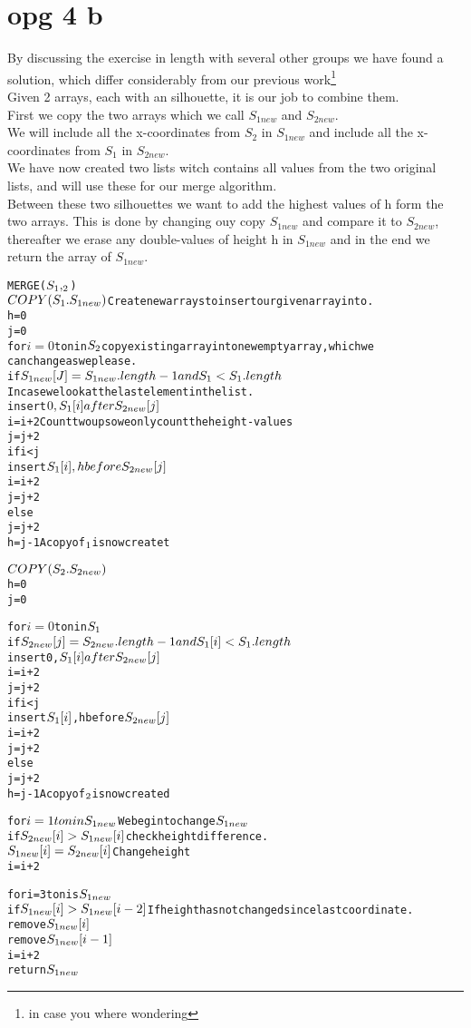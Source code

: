 \documentclass{article}
\begin{document}
\section*{opg 4 b}
By discussing the exercise in length with several other groups we have found a solution, which differ considerably from our previous work\footnote{in case you where wondering}\\
Given 2 arrays, each with an silhouette, it is our job to combine them.\\
First we copy the two arrays which we call $ S_{1new} $ and $ S_{2new} $.\\
We will include all the x-coordinates from $ S_{2} $ in $ S_{1new} $ and include all the x-coordinates from $ S_{1} $ in $ S_{2new} $.\\
We have now created two lists witch contains all values from the two original lists, and will use these for our merge algorithm.\\
Between these two silhouettes we want to add the highest values of h form the two arrays. This is done by changing ouy copy $ S_{1new} $ and compare it to $ S_{2new} $, thereafter we erase any double-values of height h in $ S_{1new} $ and in the end we return the array of $ S_{1new} $.

\begin{alltt}
MERGE(\(S\sb{1},\sb{2}\))
\(COPY(S\sb{1}. S\sb{1new})\)  Create new arrays to insert our given array into.
h=0
j=0
for \(i=0\) to n in \(S\sb{2}\)  copy existing array into new empty array, which we
                            can change as we please.
if \(S\sb{1new} [J] = S\sb{1new}.length-1 and S\sb{1} < S\sb{1}.length\)
                    In case we look at the last element in the list.
    insert \(0,S\sb{1}[i] after S\sb{2new}[j]\) 
    i=i+2             Count two up so we only count the height-values
    j=j+2
if i<j 
    insert \(S\sb{1}[i], h before S\sb{2new}[j]\)
    i=i+2
    j=j+2
else
    j=j+2
    h=j-1   A copy of \(\sb{1}\) is now createt

\(COPY(S\sb{2}. S\sb{2new})\) 
h=0
j=0

for \(i=0\) to n in \(S\sb{1}\)
if \(S\sb{2new}[j]=S\sb{2new}.length-1 and S\sb{1}[i] < S\sb{1}.length\)
    insert 0, \(S\sb{1}[i] after S\sb{2new}[j]\)
    i=i+2
    j=j+2
if i<j
    insert \(S\sb{1}[i]\), h before \(S\sb{2new}[j]\)
    i=i+2
    j=j+2
else
    j=j+2
    h=j-1    A copy of \(\sb{2}\) is now created

for \(i=1 to n in S\sb{1new}\)   We begin to change \(S\sb{1new}\)
    if \(S\sb{2new}[i] > S\sb{1new}[i]\)    check height difference.
            \(S\sb{1new}[i] = S\sb{2new}[i]\) Change height
        i=i+2
        
for i=3 to n is \(S\sb{1new}\)   
    if \(S\sb{1new}[i] > S\sb{1new}[i-2]\)  If height has not changed since last coordinate.
        remove \(S\sb{1new}[i]\)
        remove \(S\sb{1new}[i-1]\)
    i=i+2
return \(S\sb{1new}\)

\end{alltt}
\end{document}
